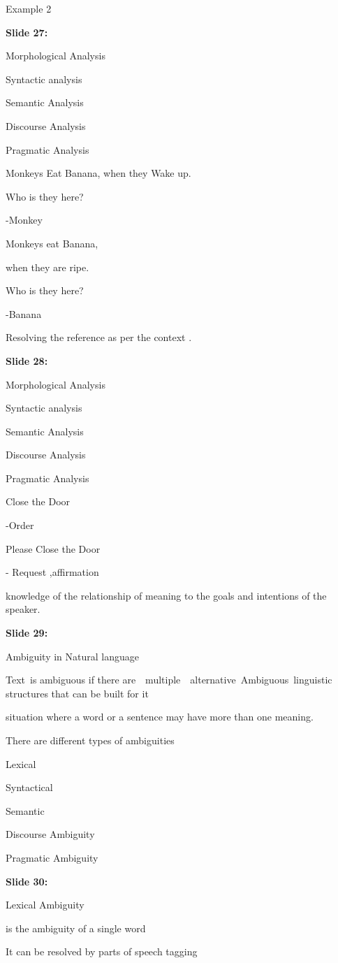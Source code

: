 \documentclass[11pt,a4paper]{article}
\begin{document}
Example 2

\textbf{Slide 27:}

Morphological Analysis

Syntactic analysis

Semantic Analysis

Discourse Analysis

Pragmatic Analysis

Monkeys Eat Banana,  when they Wake up.

Who is they here?

-Monkey

Monkeys eat Banana,

when they are ripe.

Who is they here?

-Banana

Resolving the reference as per the context .

\textbf{Slide 28:}

Morphological Analysis

Syntactic analysis

Semantic Analysis

Discourse Analysis

Pragmatic Analysis

Close the Door

-Order

Please Close the Door

- Request ,affirmation

knowledge of the relationship of meaning to the goals and intentions of the speaker.

\textbf{Slide 29:}

Ambiguity in Natural language

Text is ambiguous if there are  multiple  alternative Ambiguous linguistic structures that can be built for it

situation where a word or a sentence may have more than one meaning.

There are different types of ambiguities

Lexical

Syntactical

Semantic

Discourse Ambiguity

Pragmatic Ambiguity

\textbf{Slide 30:}

Lexical Ambiguity

is the ambiguity of a single word

It can be resolved by parts of speech tagging
\end{document}
